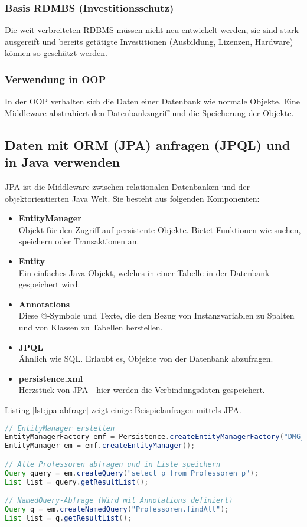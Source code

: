 \subsubsection{Basis RDMBS (Investitionsschutz)}
Die weit verbreiteten RDBMS müssen nicht neu entwickelt werden, sie sind stark ausgereift und bereits getätigte Investitionen (Ausbildung, Lizenzen, Hardware) können so geschützt werden.

\subsubsection{Verwendung in OOP}
In der OOP verhalten sich die Daten einer Datenbank wie normale Objekte. Eine Middleware abstrahiert den Datenbankzugriff und die Speicherung der Objekte.

\subsection{Daten mit ORM (JPA) anfragen (JPQL) und in Java verwenden}

JPA ist die Middleware zwischen relationalen Datenbanken und der objektorientierten Java Welt. Sie besteht aus folgenden Komponenten:

\begin{itemize}
  \item \textbf{EntityManager} \\
  Objekt für den Zugriff auf persistente Objekte. Bietet Funktionen wie suchen, speichern oder Transaktionen an.
  \item \textbf{Entity} \\
  Ein einfaches Java Objekt, welches in einer Tabelle in der Datenbank gespeichert wird.
  \item \textbf{Annotations} \\
  Diese @-Symbole und Texte, die den Bezug von Instanzvariablen zu Spalten und von Klassen zu Tabellen herstellen.
  \item \textbf{JPQL}  \\
  Ähnlich wie SQL. Erlaubt es, Objekte von der Datenbank abzufragen.
  \item \textbf{persistence.xml} \\
  Herzstück von JPA - hier werden die Verbindungsdaten gespeichert.
\end{itemize}

Listing \ref{lst:jpa-abfrage} zeigt einige Beispielanfragen mittels JPA.

\begin{lstlisting}[language=Java,keywordstyle=\color{keywordcolor},caption={JPA Grundlagen in Java},label=lst:jpa-abfrage]
// EntityManager erstellen
EntityManagerFactory emf = Persistence.createEntityManagerFactory("DMG_OOPU");
EntityManager em = emf.createEntityManager();

// Alle Professoren abfragen und in Liste speichern
Query query = em.createQuery("select p from Professoren p");
List list = query.getResultList();

// NamedQuery-Abfrage (Wird mit Annotations definiert)
Query q = em.createNamedQuery("Professoren.findAll");
List list = q.getResultList();
\end{lstlisting}

